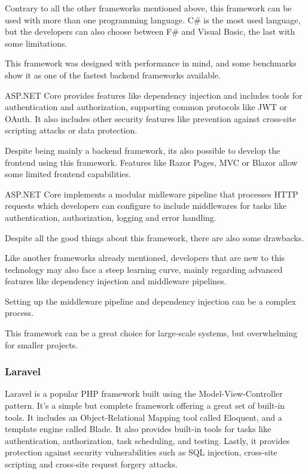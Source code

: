 Contrary to all the other frameworks mentioned above, this framework can be
used with more than one programming language. C\# is the most used language, but
the developers can also choose between F\# and Visual Basic, the last with some
limitations.

This framework was designed with performance in mind, and some benchmarks show
it as one of the fastest backend frameworks available.

ASP.NET Core provides features like dependency injection and includes tools for
authentication and authorization, supporting common protocols like JWT or OAuth.
It also includes other security features like prevention against cross-site
scripting attacks or data protection.

Despite being mainly a backend framework, its also possible to develop the
frontend using this framework. Features like Razor Pages, MVC or Blazor allow
some limited frontend capabilities.

ASP.NET Core implements a modular midleware pipeline that processes HTTP
requests which developers can configure to include middlewares for tasks like
authentication, authorization, logging and error handling.

Despite all the good things about this framework, there are also some drawbacks.

Like another frameworks already mentioned, developers that are new to this
technology may also face a steep learning curve, mainly regarding advanced
features like dependency injection and middleware pipelines.

Setting up the middleware pipeline and dependency injection can be a complex
process.

This framework can be a great choice for large-scale systems, but overwhelming
for smaller projects.
\subsubsection{Laravel}
Laravel is a popular PHP framework built using the Model-View-Controller
pattern. It's a simple but complete framework offering a great set of built-in
tools. It includes an Object-Relational Mapping tool called Eloquent, and a
template engine called Blade. It also provides built-in tools for tasks like
authentication, authorization, task scheduling, and testing. Lastly, it
provides protection against security vulnerabilities such as SQL injection,
cross-site scripting and cross-site request forgery attacks.

